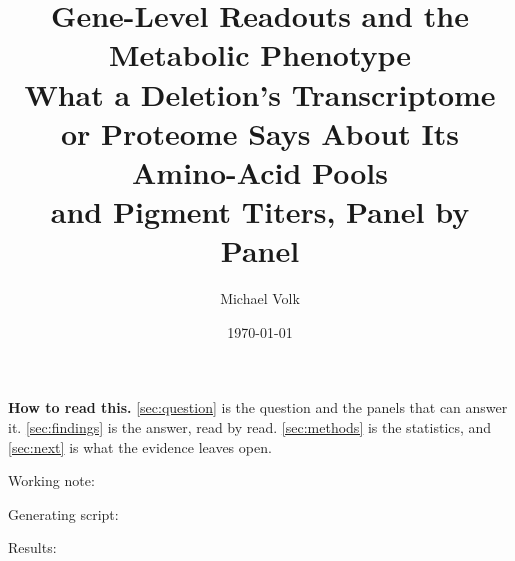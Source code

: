 \documentclass[10pt,a4paper]{article}
\title{\vspace{-1.5em}Gene-Level Readouts and the Metabolic Phenotype\\
  {\large What a Deletion's Transcriptome or Proteome Says About Its Amino-Acid Pools\\
   and Pigment Titers, Panel by Panel}}
\author{Michael Volk}
\date{\today}
\begin{document}
\maketitle
\thispagestyle{empty}

\begin{abstract}
\noindent

\end{abstract}

\vspace{0.5em}
{\small\color{tcgray}
\textbf{How to read this.} \cref{sec:question} is the question and the panels that
can answer it. \cref{sec:findings} is the answer, read by read. \cref{sec:methods} is
the statistics, and \cref{sec:next} is what the evidence leaves open.\par\smallskip

Working note: \par
Generating script: \par
Results: \par}

\vspace{1em}
\tccontents

\clearpage




\end{document}
